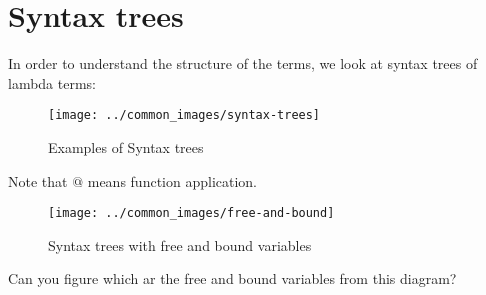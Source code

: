 \documentclass[11pt]{article}
\begin{document}
\section{Syntax trees}
In order to understand the structure of the terms, we look at syntax trees of lambda terms:
\begin{figure} [H]
	\centering
	\texttt{[image: ../common\_images/syntax-trees]}
	\caption{Examples of Syntax trees}
	\label{fig:funcapp}
\end{figure}  
Note that $@$ means function application. 
\begin{figure} [H]
	\centering
	\texttt{[image: ../common\_images/free-and-bound]}
	\caption{Syntax trees with free and bound variables}
	\label{fig:funcapp}
\end{figure}  
Can you figure which ar the free and bound variables from this diagram? 
%
%
%
%
%
%
% 
%
\end{document}

